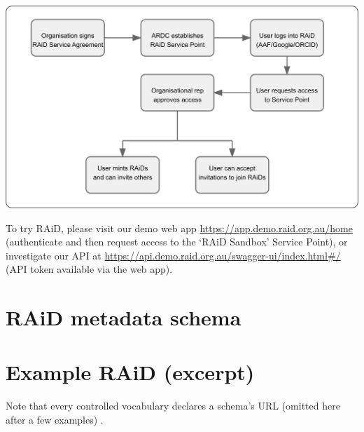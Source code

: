 \documentclass[a0,portrait]{a0poster}
\newenvironment{Figure}
  {\par\medskip\noindent\minipage{\linewidth}}
  {\endminipage\par\medskip}
\begin{document}
\begin{multicols}{3}
\begin{Figure}
  \centering
  \includegraphics[width=\linewidth]{figures/raid-workflow.png}
  \label{aws-architecture}
\end{Figure}

\large{To try RAiD, please visit our demo web app \href{https://app.demo.raid.org.au/home}{https://app.demo.raid.org.au/home} (authenticate and then request access to the ‘RAiD Sandbox’ Service Point), or investigate our API at \href{https://api.demo.raid.org.au/swagger-ui/index.html\#/}{https://api.demo.raid.org.au/swagger-ui/index.html\#/} (API token available via the web app).
}

\color{ARDCPink}
\section*{\LARGE RAiD metadata schema}
\color{DarkGrey}
\large{

}

\vspace{6cm}


\color{ARDCYellow}
\section*{\LARGE Example RAiD (excerpt)}
\color{DarkGrey}
\large{
Note that every controlled vocabulary declares a schema's URL (omitted here after a few examples) .
}

\small{

}

\end{multicols}
\end{document}
